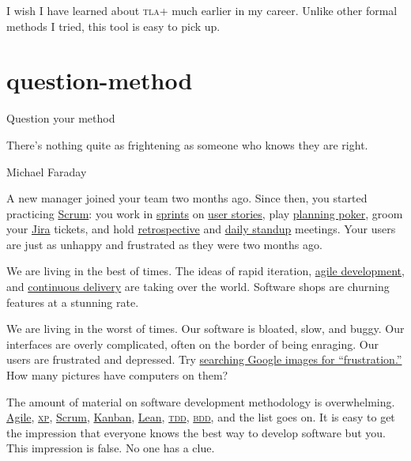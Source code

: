 \documentclass{article}
\begin{document}
I wish I have learned about \textsc{tla}+ much earlier in my career.
Unlike other formal methods I tried, this tool is easy to pick up.

\section{question-method}{Question your method}
\epigraph{
  There's nothing quite as frightening as someone who knows they are right.
}{Michael Faraday}

A new manager joined your team two months ago.
Since then, you started practicing \href{https://www.scrum.org/}{Scrum}: you work in \href{https://www.scrum.org/resources/what-is-a-sprint-in-scrum}{sprints} on \href{https://www.atlassian.com/agile/project-management/user-stories}{user stories}, play \href{https://en.wikipedia.org/wiki/Planning_poker}{planning poker}, groom your \href{https://www.atlassian.com/software/jira}{Jira} tickets, and hold \href{https://www.scrum.org/resources/what-is-a-sprint-retrospective}{retrospective} and \href{https://www.agile-academy.com/en/scrum-master/daily-standup/}{daily standup} meetings.
Your users are just as unhappy and frustrated as they were two months ago.

We are living in the best of times.
The ideas of rapid iteration, \href{https://agilemanifesto.org/}{agile development}, and \href{https://continuousdelivery.com/}{continuous delivery} are taking over the world.
Software shops are churning features at a stunning rate.

We are living in the worst of times.
Our software is bloated, slow, and buggy.
Our interfaces are overly complicated, often on the border of being enraging.
Our users are frustrated and depressed.
Try \href{https://images.google.com/?q=frustration}{searching Google images for ``frustration.''}
How many pictures have computers on them?

The amount of material on software development methodology is overwhelming.
\href{https://agilemanifesto.org/}{Agile}, \href{https://en.wikipedia.org/wiki/Extreme_programming}{\textsc{xp}}, \href{https://scrum.org}{Scrum}, \href{https://en.wikipedia.org/wiki/Kanban_(development)}{Kanban}, \href{https://www.lean.org/}{Lean}, \href{https://en.wikipedia.org/wiki/Test-driven_development}{\textsc{tdd}}, \href{https://en.wikipedia.org/wiki/Behavior-driven_development}{\textsc{bdd}}, and the list goes on.
It is easy to get the impression that everyone knows the best way to develop software but you.
This impression is false.
No one has a clue.
\end{document}
